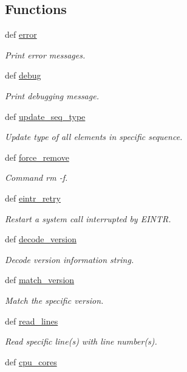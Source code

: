 \subsection*{Functions}
\begin{DoxyCompactItemize}
\item 
def \hyperlink{namespaceadmin_ae1e80d1a965f6551fa95ff379ba2b0cd}{error}
\begin{DoxyCompactList}\small\item\em Print error messages. \end{DoxyCompactList}\item 
def \hyperlink{namespaceadmin_a575bcc44ebed9e68574ccb636a66a4d2}{debug}
\begin{DoxyCompactList}\small\item\em Print debugging message. \end{DoxyCompactList}\item 
def \hyperlink{namespaceadmin_ae1dbeff3e935d67ed99b95eb814c9a11}{update\-\_\-seq\-\_\-type}
\begin{DoxyCompactList}\small\item\em Update type of all elements in specific sequence. \end{DoxyCompactList}\item 
def \hyperlink{namespaceadmin_a8b0cb2905f04979a2db7cf3bb181ad00}{force\-\_\-remove}
\begin{DoxyCompactList}\small\item\em Command {\ttfamily rm -\/f}. \end{DoxyCompactList}\item 
def \hyperlink{namespaceadmin_a186685a5e2120c71362c46b35f0705c3}{eintr\-\_\-retry}
\begin{DoxyCompactList}\small\item\em Restart a system call interrupted by {\ttfamily E\-I\-N\-T\-R}. \end{DoxyCompactList}\item 
def \hyperlink{namespaceadmin_a2605170b60fdae0f26432f209ed71f49}{decode\-\_\-version}
\begin{DoxyCompactList}\small\item\em Decode version information string. \end{DoxyCompactList}\item 
def \hyperlink{namespaceadmin_a89c4e2a6cc63b64d27825da9eb414b98}{match\-\_\-version}
\begin{DoxyCompactList}\small\item\em Match the specific version. \end{DoxyCompactList}\item 
def \hyperlink{namespaceadmin_ae034627a9fca691b23ee55d255113a81}{read\-\_\-lines}
\begin{DoxyCompactList}\small\item\em Read specific line(s) with line number(s). \end{DoxyCompactList}\item 
def \hyperlink{namespaceadmin_aae9709a9fb12e8d13ced0982b5faf0a3}{cpu\-\_\-cores}
\end{DoxyCompactItemize}
